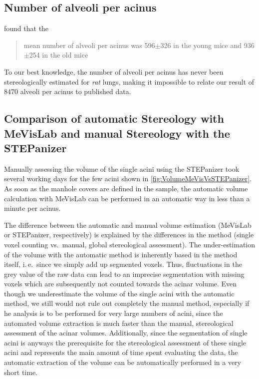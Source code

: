 \documentclass[paper=a4,abstract=true,english,DIV=calc]{scrartcl}
\newcommand{\ie}{i.\,e.\ }
\newcommand{\meannumberofalveoli}{8470} %
\begin{document}
\subsection{Number of alveoli per acinus}
\citet{Vasilescu2012} found that the \blockquote{mean number of alveoli per acinus was 596\(\pm\)326 in the young mice and 936\(\pm\)254 in the old mice}. To our best knowledge, the number of alveoli per acinus has never been stereologically estimated for \emph{rat} lungs, making it impossible to relate our result of \meannumberofalveoli\xspace alveoli per acinus to published data.

\subsection[Comparison of MeVisLab with STEPanizer]{Comparison of automatic Stereology with MeVisLab and manual Stereology with the STEPanizer}
Manually assessing the volume of the single acini using the STEPanizer took several working days for the few acini shown in \autoref{fig:VolumeMeVisVsSTEPanizer}.
As soon as the manhole covers are defined in the sample, the automatic volume calculation with MeVisLab can be performed in an automatic way in less than a minute per acinus.

The difference between the automatic and manual volume estimation (MeVisLab or STEPanizer, respectively) is explained by the differences in the method (single voxel counting vs.\ manual, global stereological assessment).
The under-estimation of the volume with the automatic method is inherently based in the method itself, \ie since we simply add up segmented voxels.
Thus, fluctuations in the grey value of the raw data can lead to an imprecise segmentation with missing voxels which are subsequently not counted towards the acinar volume.
Even though we underestimate the volume of the single acini with the automatic method, we still would not rule out completely the manual method, especially if he analysis is to be performed for very large numbers of acini, since the automated volume extraction is much faster than the manual, stereological assessment of the acinar volumes.
Additionally, since the segmentation of single acini is anyways the prerequisite for the stereological assessment of these single acini and represents the main amount of time spent evaluating the data, the automatic extraction of the volume can be automatically performed in a very short time.
\end{document}
